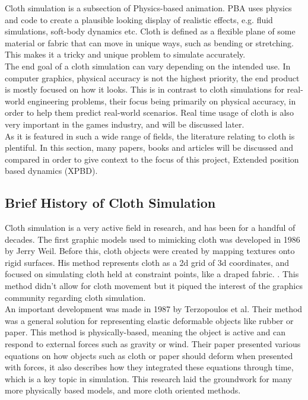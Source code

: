 \documentclass[12pt,a4paper]{article}
\begin{document}
Cloth simulation is a subsection of Physics-based animation. PBA uses physics and code to create a plausible looking display of realistic effects, e.g. fluid simulations, soft-body dynamics etc. Cloth is defined as a flexible plane of some material or fabric that can move in unique ways, such as bending or stretching. This makes it a tricky and unique problem to simulate accurately. \\

The end goal of a cloth simulation can vary depending on the intended use. In computer graphics, physical accuracy is not the highest priority, the end product is mostly focused on how it looks. This is in contrast to cloth simulations for real-world engineering problems, their focus being primarily on physical accuracy, in order to help them predict real-world scenarios. Real time usage of cloth is also very important in the games industry, and will be discussed later. \\

As it is featured in such a wide range of fields, the literature relating to cloth is plentiful. In this section, many papers, books and articles will be discussed and compared in order to give context to the focus of this project, Extended position based dynamics (XPBD).

\subsection{Brief History of Cloth Simulation}
\label{History}
Cloth simulation is a very active field in research, and has been for a handful of decades. The first graphic models used to mimicking cloth was developed in 1986 by Jerry Weil. Before this, cloth objects were created by mapping textures onto rigid surfaces. His method represents cloth as a 2d grid of 3d coordinates, and focused on simulating cloth held at constraint points, like a draped fabric. \cite{weil_synthesis_1986}. This method didn't allow for cloth movement but it piqued the interest of the graphics community regarding cloth simulation. \\

An important development was made in 1987 by Terzopoulos et al. Their method was a general solution for representing elastic deformable objects like rubber or paper. This method is physically-based, meaning the object is active and can respond to external forces such as gravity or wind. Their paper presented various equations on how objects such as cloth or paper should deform when presented with forces, it also describes how they integrated these equations through time, which is a key topic in simulation. This research laid the groundwork for many more physically based models, and more cloth oriented methods. \cite{terzopoulos1987elastically} \\
\end{document}
